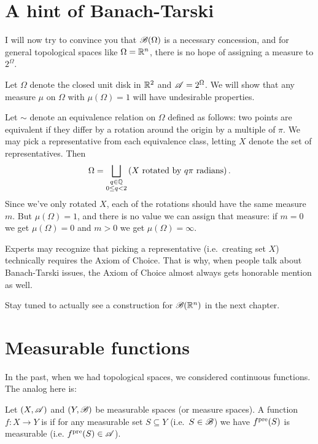 \section{A hint of Banach-Tarski}
I will now try to convince you that $\mathscr B(\Omega)$
is a necessary concession,
and for general topological spaces like $\Omega = \mathbb R^n$,
there is no hope of assigning a measure to $2^{\Omega}$.
\begin{example}
	[A geometric example of why $\SA = 2^\Omega$ is unsuitable]
	Let $\Omega$ denote the closed unit disk in $\mathbb R^2$
	and $\SA = 2^\Omega$.
	We will show that any measure $\mu$ on $\Omega$
	with $\mu(\Omega) = 1$ will have undesirable properties.

	Let $\sim$ denote an equivalence relation on $\Omega$
	defined as follows: two points are equivalent
	if they differ by a rotation around the origin by a multiple of $\pi$.
	We may pick a representative from each equivalence class,
	letting $X$ denote the set of representatives.
	Then
	\[ \Omega = \bigsqcup_{\substack{q \in \mathbb Q \\ 0 \le q < 2}}
		\left( X \text{ rotated by $q\pi$ radians} \right).  \]
	Since we've only rotated $X$,
	each of the rotations should have the same measure $m$.
	But $\mu(\Omega) = 1$,
	and there is no value we can assign that measure:
	if $m = 0$ we get $\mu(\Omega) = 0$
	and $m > 0$ we get $\mu(\Omega) = \infty$.
\end{example}
\begin{remark}
	[Choice]
	Experts may recognize that picking a representative
	(i.e.\ creating set $X$)
	technically requires the Axiom of Choice.
	That is why, when people talk about Banach-Tarski issues,
	the Axiom of Choice almost always gets honorable mention as well.
\end{remark}

Stay tuned to actually see a construction for $\mathscr B(\mathbb R^n)$
in the next chapter.

\section{Measurable functions}
In the past, when we had topological spaces,
we considered continuous functions.
The analog here is:
\begin{definition}
	Let $(X, \mathscr A)$ and $(Y, \mathscr B)$ be measurable spaces
	(or measure spaces).
	A function $f \colon X \to Y$ is 
	if for any measurable set $S \subseteq Y$ (i.e.\ $S \in \mathscr B$)
	we have $f^{\text{pre}}(S)$ is measurable (i.e. $f^{\text{pre}}(S) \in \mathscr A$).
\end{definition}


